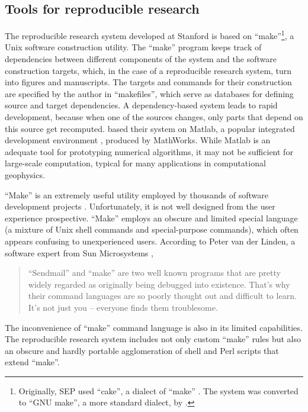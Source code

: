 \subsection{Tools for reproducible research}

The reproducible research system developed at Stanford is based on
``make''\footnote{Originally, SEP used ``cake'', a dialect of ``make''
  \cite[]{Nichols.sep.61.341,Claerbout.sep.67.145,Claerbout.sep.73.451,Claerbout.sep.77.427}.
  The system was converted to ``GNU make'', a more standard dialect, by
  \cite{Schwab.sep.89.217}.}, a Unix software construction utility. The
``make'' program keeps track of dependencies between different components of
the system and the software construction targets, which, in the case of a
reproducible research system, turn into figures and manuscripts. The targets
and commands for their construction are specified by the author in
``makefiles'', which serve as databases for defining source and target
dependencies. A dependency-based system leads to rapid development, because
when one of the sources changes, only parts that depend on this source get
recomputed.  \cite{donoho} based their system on Matlab, a popular integrated
development environment \cite[]{matlab}, produced by MathWorks.  While Matlab
is an adequate tool for prototyping numerical algorithms, it may not be
sufficient for large-scale computation, typical for many applications in
computational geophysics.

``Make'' is an extremely useful utility employed by thousands of software
development projects \cite[]{make}. Unfortunately, it is not well designed
from the user experience prospective. ``Make'' employs an obscure and limited
special language (a mixture of Unix shell commands and special-purpose
commands), which often appears confusing to unexperienced users. According to
Peter van der Linden, a software expert from Sun Microsystems \cite[]{linden},
\begin{quote}
  ``Sendmail'' and ``make'' are two well known programs that are pretty widely
  regarded as originally being debugged into existence. That's why their
  command languages are so poorly thought out and difficult to learn. It's not
  just you -- everyone finds them troublesome.
\end{quote}
The inconvenience of ``make'' command language is also in its limited
capabilities.  The reproducible research system includes not only custom
``make'' rules but also an obscure and hardly portable agglomeration of shell
and Perl scripts that extend ``make''.


